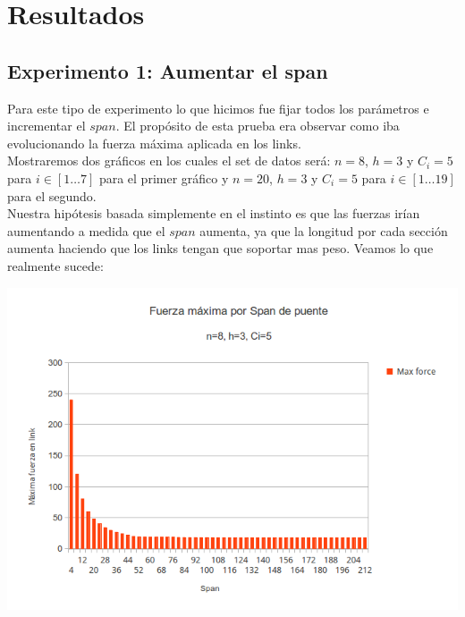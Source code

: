 \section{Resultados}

\subsection{Experimento 1: Aumentar el span}

Para este tipo de experimento lo que hicimos fue fijar todos los parámetros e incrementar el $span$. El propósito de esta prueba era observar como iba evolucionando la fuerza máxima aplicada en los links.\\

Mostraremos dos gráficos en los cuales el set de datos será: $n = 8$, $h = 3$ y $C_i = 5$ para $i \in [1 \dots 7]$ para el primer gráfico y $n = 20$, $h = 3$ y $C_i = 5$ para $i \in [1 \dots 19]$ para el segundo.\\

Nuestra hipótesis basada simplemente en el instinto es que las fuerzas irían aumentando a medida que el $span$ aumenta, ya que la longitud por cada sección aumenta haciendo que los links tengan que soportar mas peso. Veamos lo que realmente sucede:

\begin{center}
\includegraphics[scale=0.8]{archivos/graficos/Fuerza-x-span.png}\\
\end{center}

